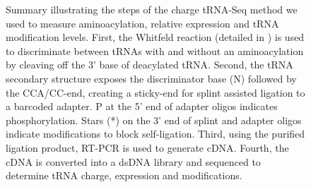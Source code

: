 \documentclass[9pt,lineno]{elife}
\begin{document}
\begin{figure}[ht!]
\centering
{}
\caption{
Summary illustrating the steps of the charge tRNA-Seq method we used to measure aminoacylation, relative expression and tRNA modification levels.
First, the Whitfeld reaction (detailed in ) is used to discriminate between tRNAs with and without an aminoacylation by cleaving off the 3’ base of deacylated tRNA.
Second, the tRNA secondary structure exposes the discriminator base (N) followed by the CCA/CC-end, creating a sticky-end for splint assisted ligation to a barcoded adapter.
P at the 5’ end of adapter oligos indicates phosphorylation.
Stars (*) on the 3’ end of splint and adapter oligos indicate modifications to block self-ligation.
Third, using the purified ligation product, RT-PCR is used to generate cDNA.
Fourth, the cDNA is converted into a dsDNA library and sequenced to determine tRNA charge, expression and modifications.
}
\label{fig:Fig1}

\label{figsupp:f1S1}
\end{figure}
\end{document}
